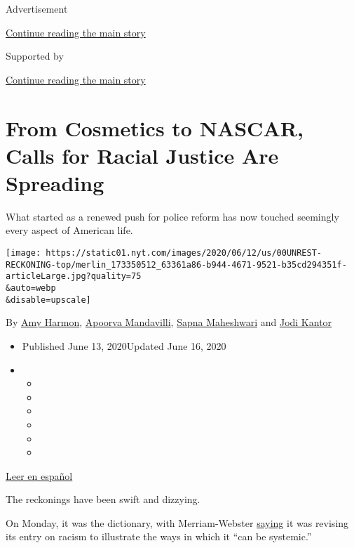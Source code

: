 Advertisement

\protect\hyperlink{after-top}{Continue reading the main story}

Supported by

\protect\hyperlink{after-sponsor}{Continue reading the main story}

\hypertarget{from-cosmetics-to-nascar-calls-for-racial-justice-are-spreading}{%
\section{From Cosmetics to NASCAR, Calls for Racial Justice Are
Spreading}\label{from-cosmetics-to-nascar-calls-for-racial-justice-are-spreading}}

What started as a renewed push for police reform has now touched
seemingly every aspect of American life.

\texttt{[image: https://static01.nyt.com/images/2020/06/12/us/00UNREST-RECKONING-top/merlin\_173350512\_63361a86-b944-4671-9521-b35cd294351f-articleLarge.jpg?quality=75\\\&auto=webp\\\&disable=upscale]}

By \href{https://www.nytimes.com/by/amy-harmon}{Amy Harmon},
\href{https://www.nytimes.com/by/apoorva-mandavilli}{Apoorva
Mandavilli}, \href{https://www.nytimes.com/by/sapna-maheshwari}{Sapna
Maheshwari} and \href{https://www.nytimes.com/by/jodi-kantor}{Jodi
Kantor}

\begin{itemize}
\item
  Published June 13, 2020Updated June 16, 2020
\item
  \begin{itemize}
  \item
  \item
  \item
  \item
  \item
  \item
  \end{itemize}
\end{itemize}

\href{https://www.nytimes.com/es/2020/06/15/espanol/mundo/racismo-george-floyd-protestas.html}{Leer
en español}

The reckonings have been swift and dizzying.

On Monday, it was the dictionary, with Merriam-Webster
\href{https://www.nytimes.com/2020/06/10/us/merriam-webster-racism-definition.html}{saying}
it was revising its entry on racism to illustrate the ways in which it
``can be systemic.''

